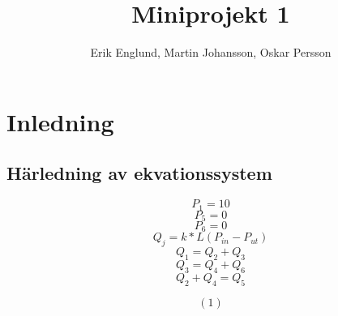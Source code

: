 \documentclass[12pt, a4paper]{report}
\title{Miniprojekt 1}
\author{Erik Englund, Martin Johansson, Oskar Persson}
\begin{document}
\maketitle
\tableofcontents
\section{Inledning}

\subsection{Härledning av ekvationssystem}

$$P_1 = 10$$
$$P_5 = 0$$
$$P_6 = 0$$
$$Q_j = k * L(P_{in} - P_{ut})$$
$$Q_1 = Q_2 + Q_3$$
$$Q_3 = Q_4 + Q_6$$
$$Q_2 + Q_4 = Q_5$$

$$(1) $$
\end{document}
